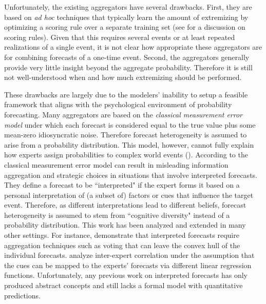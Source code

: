 \documentclass[11pt,twoside]{article}
\theoremstyle{definition}
\theoremstyle{definition}
\begin{document}
Unfortunately, the existing aggregators have several drawbacks. First, they are based on \textit{ad hoc} techniques that typically learn the amount of extremizing by optimizing a scoring rule over a separate training set (see \cite{Gneiting04strictlyproper} for a discussion on scoring rules). Given that this requires several events or at least repeated realizations of a single event, it is not clear how appropriate these aggregators are for combining forecasts of a one-time event. 
Second, the aggregators generally provide very little insight beyond the aggregate probability. Therefore it is still not well-understood when and how much extremizing should be performed. 


These drawbacks are largely due to the modelers' inability to setup a feasible framework that aligns with the psychological environment of probability forecasting. Many aggregators are based on the \textit{classical measurement error model} under which each forecast is considered equal to the true value plus some mean-zero idiosyncratic noise. Therefore forecast heterogeneity is assumed to arise from a probability distribution. This model, however, cannot fully explain how experts assign probabilities to complex world events (\cite{parunak2013exploiting}). According to \cite{hong2009interpreted} the classical measurement error model can result in misleading information aggregation and strategic choices in situations that involve interpreted forecasts. They define a forecast to be ``interpreted" if the expert forms it based on a personal interpretation of (a subset of) factors or cues that influence the target event. Therefore, as different interpretations lead to different beliefs, forecast heterogeneity is assumed to stem from ``cognitive diversity" instead of a probability distribution. This work has been analyzed and extended in many other settings. For instance, \cite{parunak2013characterizing} demonstrate that interpreted forecasts require aggregation techniques such as voting that can leave the convex hull of the individual forecasts. \cite{broomell2009experts} analyze inter-expert correlation under the assumption that the cues can be mapped to the experts' forecasts via different linear regression functions. Unfortunately, any previous work on interpreted forecasts has only produced abstract concepts and still lacks a formal model with quantitative predictions. 
\end{document}
